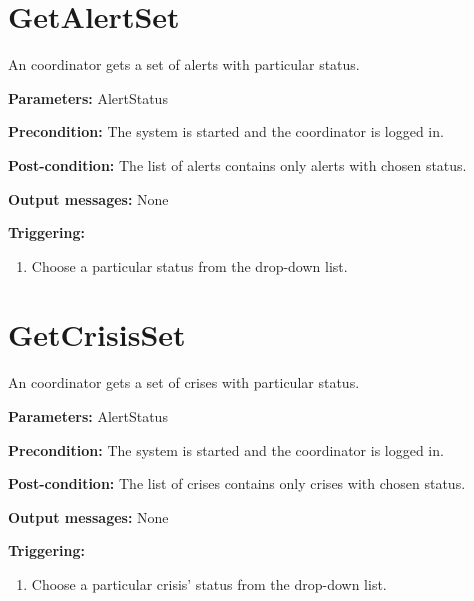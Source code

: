 \section{GetAlertSet}
\label{operation:GetAlertSet}

An coordinator gets a set of alerts with particular status.

\begin{description}
	\item \textbf{Parameters:} AlertStatus 
	\item \textbf{Precondition:} The system is started and the coordinator is
	logged in.
	\item \textbf{Post-condition:} The list of alerts contains only alerts with chosen status.
	\item \textbf{Output messages:} None
		
	\item \textbf{Triggering:}
	
	\begin{enumerate}
		\item Choose a particular status from the drop-down list.
	\end{enumerate}
\end{description}

\section{GetCrisisSet}
\label{operation:GetCrisisSet}

An coordinator gets a set of crises with particular status.

\begin{description}
	\item \textbf{Parameters:} AlertStatus  
	\item \textbf{Precondition:} The system is started and the coordinator is
	logged in.
	\item \textbf{Post-condition:} The list of crises contains only crises with
	chosen status.
	\item \textbf{Output messages:} None
	
	\item \textbf{Triggering:}
	
	\begin{enumerate}
		\item Choose a particular crisis' status from the drop-down list.
	\end{enumerate}
\end{description}

